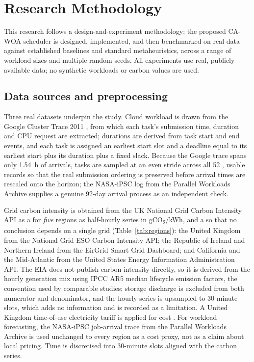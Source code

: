 \documentclass[12pt,a4paper]{article}
\providecommand{\DIFaddtex}[1]{{\protect\color{blue} \sf #1}} %
\providecommand{\DIFdeltex}[1]{{\protect\color{red} \scriptsize #1}} %
\providecommand{\DIFaddbegin}{} %
\providecommand{\DIFaddend}{} %
\providecommand{\DIFdelbegin}{} %
\providecommand{\DIFdelend}{} %
\providecommand{\DIFadd}[1]{\texorpdfstring{\DIFaddtex{#1}}{#1}} %
\providecommand{\DIFdel}[1]{\texorpdfstring{\DIFdeltex{#1}}{}} %
\providecommand{\DIFscaledelfig}{0.5}
\newlength{\DIFdelgraphicswidth} %
\newlength{\DIFdelgraphicsheight} %
\providecommand{\DIFaddincludegraphics}[2][]{{\color{blue}\fbox{\DIFOincludegraphics[#1]{#2}}}} %
\providecommand{\DIFdelincludegraphics}[2][]{%
\sbox{\DIFdelgraphicsbox}{\DIFOincludegraphics[#1]{#2}}%
\settoboxwidth{\DIFdelgraphicswidth}{\DIFdelgraphicsbox} %
\settoboxtotalheight{\DIFdelgraphicsheight}{\DIFdelgraphicsbox} %
\scalebox{\DIFscaledelfig}{%
\parbox[b]{\DIFdelgraphicswidth}{\usebox{\DIFdelgraphicsbox}\\[-\baselineskip] \rule{\DIFdelgraphicswidth}{0em}}\llap{\resizebox{\DIFdelgraphicswidth}{\DIFdelgraphicsheight}{%
\setlength{\unitlength}{\DIFdelgraphicswidth}%
\begin{picture}(1,1)%
\thicklines\linethickness{2pt} %
{\color[rgb]{1,0,0}\put(0,0){\framebox(1,1){}}}%
{\color[rgb]{1,0,0}\put(0,0){\line( 1,1){1}}}%
{\color[rgb]{1,0,0}\put(0,1){\line(1,-1){1}}}%
\end{picture}%
}\hspace*{3pt}}} %
} %
\DeclareRobustCommand{\DIFaddbegin}{\DIFOaddbegin \let\includegraphics\DIFaddincludegraphics} %
\DeclareRobustCommand{\DIFaddend}{\DIFOaddend \let\includegraphics\DIFOincludegraphics} %
\DeclareRobustCommand{\DIFdelbegin}{\DIFOdelbegin \let\includegraphics\DIFdelincludegraphics} %
\DeclareRobustCommand{\DIFdelend}{\DIFOaddend \let\includegraphics\DIFOincludegraphics} %
\begin{document}
\section{Research Methodology}\label{sec:method}
This research follows a design-and-experiment methodology: the proposed CA-WOA scheduler is designed,
implemented, and then benchmarked on real data against established baselines and standard metaheuristics,
across a range of workload sizes and multiple random seeds. All experiments use real, publicly available data;
no synthetic workloads or carbon values are used.

\subsection{Data sources and preprocessing}
Three real datasets underpin the study. Cloud workload is drawn from the Google Cluster Trace 2011
\cite{reiss2011google}, from which each task's submission time, duration and CPU request are extracted;
durations are derived from task start and end events, and each task is assigned an earliest start slot and a
deadline equal to its earliest start plus its duration plus a fixed slack. \DIFaddbegin \DIFadd{Because the Google trace spans only 1.54~h of
arrivals, tasks are sampled at an even stride across all 52}{\DIFadd{,}}\DIFadd{057 usable records so that the real submission
ordering is preserved before arrival times are rescaled onto the horizon; the NASA-iPSC log from the Parallel
Workloads Archive supplies a genuine 92-day arrival process as an independent check.
}

\DIFaddend Grid carbon intensity is obtained \DIFdelbegin \DIFdel{from the UK National Grid Carbon Intensity API as a }\DIFdelend \DIFaddbegin \DIFadd{for \emph{five} regions as }\DIFaddend half-hourly series in
gCO\textsubscript{2}/kWh, \DIFdelbegin \DIFdel{and a
}\DIFdelend \DIFaddbegin \DIFadd{so that no conclusion depends on a single grid
(Table~\ref{tab:regions}): the United Kingdom from the National Grid ESO Carbon Intensity API; the Republic of
Ireland and Northern Ireland from the EirGrid Smart Grid Dashboard; and California and the Mid-Atlantic from
the United States Energy Information Administration API. The EIA does not publish carbon intensity directly,
so it is derived from the hourly generation mix using IPCC AR5 median lifecycle emission factors, the
convention used by comparable studies; storage discharge is excluded from both numerator and denominator, and
the hourly series is upsampled to 30-minute slots, which adds no information and is recorded as a limitation.
A United Kingdom }\DIFaddend time-of-use \DIFdelbegin \DIFdel{electricity }\DIFdelend tariff is applied \DIFdelbegin \DIFdel{for cost . For workload forecasting, the NASA-iPSC job-arrival trace
from the Parallel Workloads Archive is used}\DIFdelend \DIFaddbegin \DIFadd{unchanged to every region as a cost proxy, not as a claim about
local pricing}\DIFaddend . Time is discretised into 30-minute slots aligned with the carbon series.
\end{document}
